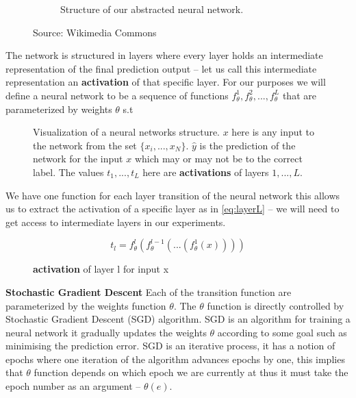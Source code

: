 \documentclass[dissertation.tex]{subfiles}
\begin{document}
\begin{figure}[H]
\begin{subfigure}[t]{0.49\textwidth}
    \caption{
      Structure of our abstracted neural network.
    }
    \label{fig:nnModified}
  \end{subfigure}
    \caption{
      Source: Wikimedia Commons 
    }
\end{figure}

The network is structured in layers where every layer holds an intermediate
representation of the final prediction output -- let us call this intermediate
representation an \textbf{activation} of that specific layer. For our purposes
we will define a neural network to be a sequence of functions
$f_{\theta}^1,f_{\theta}^2,...,f_{\theta}^L$ that are parameterized by weights
$\theta$ s.t


\vspace*{-\baselineskip}
\vspace*{-\baselineskip}
\begin{figure}[H]
  \centering
  \caption{
    Visualization of a neural networks structure.  $x$ here is any input to the
    network from the set $\{x_i,...,x_N\}$.  $\hat{y}$ is the prediction of the
    network for the input $x$ which may or may not be to the correct label. The
    values $t_1,...,t_L$ here are \textbf{activations} of layers $1,...,L$.
  }
  \label{fig:network}
\end{figure}

We have one function for each layer transition of the neural network this allows
us to extract the activation of a specific layer as in \autoref{eq:layerL} -- we
will need to get access to intermediate layers in our experiments.

\begin{figure}[H]
  \[ t_l = f_{\theta}^l(f_{\theta}^{l-1}(...(f_{\theta}^1(x)))) \]
  \caption{\textbf{activation} of layer l for input x}
  \label{eq:layerL}
\end{figure}

\textbf{Stochastic Gradient Descent} Each of the transition function are
parameterized by the weights function $\theta$. The $\theta$ function is
directly controlled by Stochastic Gradient Descent (SGD) algorithm.  SGD is an
algorithm for training a neural network it gradually updates the weights
$\theta$ according to some goal such as minimising the prediction error.  SGD is
an iterative process, it has a notion of epochs where one iteration of the
algorithm advances epochs by one, this implies that $\theta$ function depends on
which epoch we are currently at thus it must take the epoch number as an
argument -- $\theta(e)$.
\end{document}
